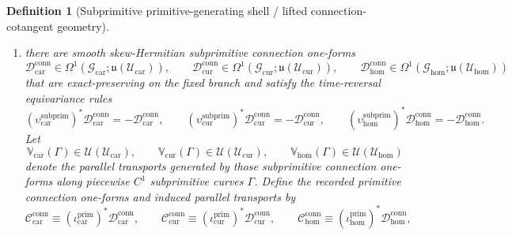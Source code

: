 \documentclass[11pt]{article}
\newcommand{\RootTensorClass}{\mathscr U_{\mathrm{car}}}
\newcommand{\RootRelabelClass}{\mathscr U_{\mathrm{cur}}}
\newcommand{\RootFreeClass}{\mathscr U_{\mathrm{hom}}}
\newcommand{\TensorPrimitiveLiouville}{\boldsymbol{\Lambda}_{\mathrm{car}}^{\mathrm{prim}}}
\newcommand{\CurPrimitiveLiouville}{\boldsymbol{\Lambda}_{\mathrm{cur}}^{\mathrm{prim}}}
\newcommand{\HomPrimitiveLiouville}{\boldsymbol{\Lambda}_{\mathrm{hom}}^{\mathrm{prim}}}
\newcommand{\TensorPrimitiveTwo}{\boldsymbol{\Xi}_{\mathrm{car}}^{\mathrm{prim}}}
\newcommand{\CurPrimitiveTwo}{\boldsymbol{\Xi}_{\mathrm{cur}}^{\mathrm{prim}}}
\newcommand{\HomPrimitiveTwo}{\boldsymbol{\Xi}_{\mathrm{hom}}^{\mathrm{prim}}}
\newcommand{\TensorPrimitiveConnectionForm}{\mathcal C_{\mathrm{car}}^{\mathrm{conn}}}
\newcommand{\CurPrimitiveConnectionForm}{\mathcal C_{\mathrm{cur}}^{\mathrm{conn}}}
\newcommand{\HomPrimitiveConnectionForm}{\mathcal C_{\mathrm{hom}}^{\mathrm{conn}}}
\newcommand{\TensorSubprimitiveSpace}{\mathcal G_{\mathrm{car}}}
\newcommand{\CurSubprimitiveSpace}{\mathcal G_{\mathrm{cur}}}
\newcommand{\HomSubprimitiveSpace}{\mathcal G_{\mathrm{hom}}}
\newcommand{\TensorSubprimitiveTimeRev}{\upsilon_{\mathrm{car}}^{\mathrm{subprim}}}
\newcommand{\CurSubprimitiveTimeRev}{\upsilon_{\mathrm{cur}}^{\mathrm{subprim}}}
\newcommand{\HomSubprimitiveTimeRev}{\upsilon_{\mathrm{hom}}^{\mathrm{subprim}}}
\newcommand{\TensorPrimitiveInc}{\iota_{\mathrm{car}}^{\mathrm{prim}}}
\newcommand{\CurPrimitiveInc}{\iota_{\mathrm{cur}}^{\mathrm{prim}}}
\newcommand{\HomPrimitiveInc}{\iota_{\mathrm{hom}}^{\mathrm{prim}}}
\newcommand{\TensorSubprimitiveLiouville}{\boldsymbol{\Lambda}_{\mathrm{car}}^{\mathrm{subprim}}}
\newcommand{\CurSubprimitiveLiouville}{\boldsymbol{\Lambda}_{\mathrm{cur}}^{\mathrm{subprim}}}
\newcommand{\HomSubprimitiveLiouville}{\boldsymbol{\Lambda}_{\mathrm{hom}}^{\mathrm{subprim}}}
\newcommand{\TensorSubprimitiveTwo}{\boldsymbol{\Xi}_{\mathrm{car}}^{\mathrm{subprim}}}
\newcommand{\CurSubprimitiveTwo}{\boldsymbol{\Xi}_{\mathrm{cur}}^{\mathrm{subprim}}}
\newcommand{\HomSubprimitiveTwo}{\boldsymbol{\Xi}_{\mathrm{hom}}^{\mathrm{subprim}}}
\newcommand{\TensorSubprimitiveConnectionForm}{\mathcal D_{\mathrm{car}}^{\mathrm{conn}}}
\newcommand{\CurSubprimitiveConnectionForm}{\mathcal D_{\mathrm{cur}}^{\mathrm{conn}}}
\newcommand{\HomSubprimitiveConnectionForm}{\mathcal D_{\mathrm{hom}}^{\mathrm{conn}}}
\newcommand{\TensorSubprimitiveTransport}{\mathbb V_{\mathrm{car}}}
\newcommand{\CurSubprimitiveTransport}{\mathbb V_{\mathrm{cur}}}
\newcommand{\HomSubprimitiveTransport}{\mathbb V_{\mathrm{hom}}}
\newcommand{\LieU}{\mathfrak u}
\newtheorem{definition}{Definition}
\begin{document}
\begin{definition}[Subprimitive primitive-generating shell / lifted connection-cotangent geometry]
\begin{enumerate}
\[    \]
    Define the recorded primitive Liouville one-forms and closed two-forms by shell restriction:
    \begin{equation}
    \TensorPrimitiveLiouville\equiv(\TensorPrimitiveInc)^*\TensorSubprimitiveLiouville,\qquad
    \CurPrimitiveLiouville\equiv(\CurPrimitiveInc)^*\CurSubprimitiveLiouville,\qquad
    \HomPrimitiveLiouville\equiv(\HomPrimitiveInc)^*\HomSubprimitiveLiouville,
    \label{eq:primitive_liouville_from_subprimitive}
    \end{equation}
    \begin{equation}
    \TensorPrimitiveTwo\equiv(\TensorPrimitiveInc)^*\TensorSubprimitiveTwo,\qquad
    \CurPrimitiveTwo\equiv(\CurPrimitiveInc)^*\CurSubprimitiveTwo,\qquad
    \HomPrimitiveTwo\equiv(\HomPrimitiveInc)^*\HomSubprimitiveTwo.
    \label{eq:primitive_two_from_subprimitive}
    \end{equation}
    \item there are smooth skew-Hermitian subprimitive connection one-forms
    \[
    \TensorSubprimitiveConnectionForm\in\Omega^1(\TensorSubprimitiveSpace;\LieU(\RootTensorClass)),\qquad
    \CurSubprimitiveConnectionForm\in\Omega^1(\CurSubprimitiveSpace;\LieU(\RootRelabelClass)),\qquad
    \HomSubprimitiveConnectionForm\in\Omega^1(\HomSubprimitiveSpace;\LieU(\RootFreeClass))
    \]
    that are exact-preserving on the fixed branch and satisfy the time-reversal equivariance rules
    \[
    (\TensorSubprimitiveTimeRev)^*\TensorSubprimitiveConnectionForm=-\TensorSubprimitiveConnectionForm,\qquad
    (\CurSubprimitiveTimeRev)^*\CurSubprimitiveConnectionForm=-\CurSubprimitiveConnectionForm,\qquad
    (\HomSubprimitiveTimeRev)^*\HomSubprimitiveConnectionForm=-\HomSubprimitiveConnectionForm.
    \]
    Let
    \[
    \TensorSubprimitiveTransport(\Gamma)\in\mathcal U(\RootTensorClass),\qquad
    \CurSubprimitiveTransport(\Gamma)\in\mathcal U(\RootRelabelClass),\qquad
    \HomSubprimitiveTransport(\Gamma)\in\mathcal U(\RootFreeClass)
    \]
    denote the parallel transports generated by those subprimitive connection one-forms along piecewise \(C^1\) subprimitive curves \(\Gamma\). Define the recorded primitive connection one-forms and induced parallel transports by
    \begin{equation}
    \TensorPrimitiveConnectionForm\equiv(\TensorPrimitiveInc)^*\TensorSubprimitiveConnectionForm,\qquad
    \CurPrimitiveConnectionForm\equiv(\CurPrimitiveInc)^*\CurSubprimitiveConnectionForm,\qquad
    \HomPrimitiveConnectionForm\equiv(\HomPrimitiveInc)^*\HomSubprimitiveConnectionForm,
    \label{eq:primitive_connection_from_subprimitive}

\end{equation}
\end{enumerate}
\end{definition}
\end{document}
